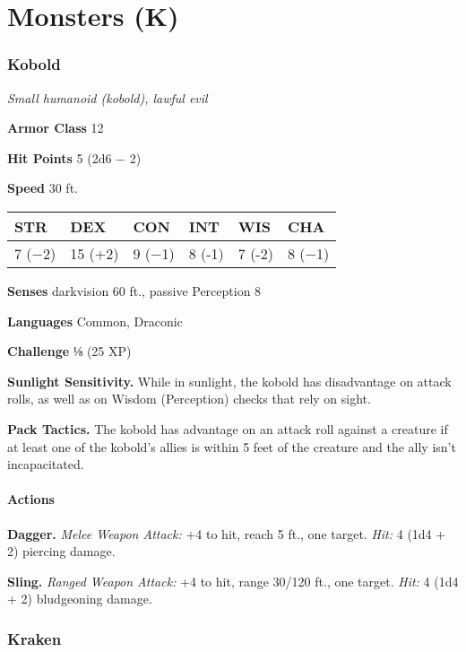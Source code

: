 \documentclass[
]{article}
\date{}
\begin{document}
\hypertarget{monsters-k}{%
\section{Monsters (K)}\label{monsters-k}}

\hypertarget{kobold}{%
\subsubsection{Kobold}\label{kobold}}

\emph{Small humanoid (kobold), lawful evil}

\textbf{Armor Class} 12

\textbf{Hit Points} 5 (2d6 − 2)

\textbf{Speed} 30 ft.

\begin{longtable}[]{@{}llllll@{}}
\toprule
STR & DEX & CON & INT & WIS & CHA\tabularnewline
\midrule
\endhead
7 (−2) & 15 (+2) & 9 (−1) & 8 (-1) & 7 (-2) & 8 (−1)\tabularnewline
\bottomrule
\end{longtable}

\textbf{Senses} darkvision 60 ft., passive Perception 8

\textbf{Languages} Common, Draconic

\textbf{Challenge} ⅛ (25 XP)

\textbf{Sunlight Sensitivity.} While in sunlight, the kobold has
disadvantage on attack rolls, as well as on Wisdom (Perception) checks
that rely on sight.

\textbf{Pack Tactics.} The kobold has advantage on an attack roll
against a creature if at least one of the kobold's allies is within 5
feet of the creature and the ally isn't incapacitated.

\hypertarget{actions}{%
\paragraph{Actions}\label{actions}}

\textbf{Dagger.} \emph{Melee Weapon Attack:} +4 to hit, reach 5 ft., one
target. \emph{Hit:} 4 (1d4 + 2) piercing damage.

\textbf{Sling.} \emph{Ranged Weapon Attack:} +4 to hit, range 30/120
ft., one target. \emph{Hit:} 4 (1d4 + 2) bludgeoning damage.

\hypertarget{kraken}{%
\subsubsection{Kraken}\label{kraken}}
\end{document}
